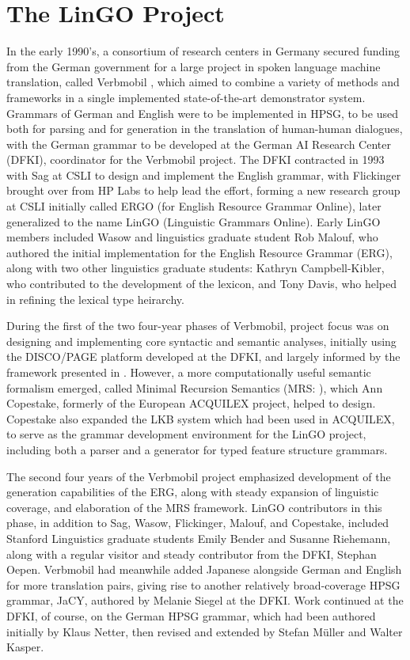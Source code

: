 \documentclass[output=paper]{langsci/langscibook}
\begin{document}
\section{The LinGO Project}

In the early 1990's, a consortium of research centers in Germany secured funding from the German government for a large project in spoken language machine translation, called Verbmobil \citep{Wahlster2000a-ed}, which aimed to combine a variety of methods and frameworks in a single implemented state-of-the-art demonstrator system.  Grammars of German and English were to be implemented in HPSG, to be used both for parsing and for generation in the translation of human-human dialogues, with the German grammar to be developed at the German AI Research Center (DFKI), coordinator for the Verbmobil project.  The DFKI contracted in 1993 with Sag at CSLI to design and implement the English grammar, with Flickinger brought over from HP Labs to help lead the effort, forming a new research group at CSLI initially called ERGO (for English Resource Grammar Online), later generalized to the name LinGO (Linguistic Grammars Online).  Early LinGO members included Wasow and linguistics graduate student Rob Malouf, who authored the initial implementation for the English Resource Grammar (ERG), along with two other linguistics graduate students: Kathryn Campbell-Kibler, who contributed to the development of the lexicon, and Tony Davis, who helped in refining the lexical type heirarchy.

During the first of the two four-year phases of Verbmobil, project focus was on designing and implementing core syntactic and semantic analyses, initially using the DISCO/PAGE platform developed at the DFKI, and largely informed by the framework presented in \citet{ps2}.  However, a more computationally useful semantic formalism emerged, called Minimal Recursion Semantics (MRS: \citet{mrs}), which Ann Copestake, formerly of the European ACQUILEX project, helped to design.  Copestake also expanded the LKB system \citep{Copestake2002a-Short} which had been used in ACQUILEX, to serve as the grammar development environment for the LinGO project, including both a parser and a generator for typed feature structure grammars.

The second four years of the Verbmobil project emphasized development of the generation capabilities of the ERG, along with steady expansion of linguistic coverage, and elaboration of the MRS framework.  LinGO contributors in this phase, in addition to Sag, Wasow, Flickinger, Malouf, and Copestake, included Stanford Linguistics graduate students Emily Bender and Susanne Riehemann, along with a regular visitor and steady contributor from the DFKI, Stephan Oepen.  Verbmobil had meanwhile added Japanese alongside German and English for more translation pairs, giving rise to another relatively broad-coverage HPSG grammar, JaCY, authored by Melanie Siegel at the DFKI.  Work continued at the DFKI, of course, on the German HPSG grammar, which had been authored initially by Klaus Netter, then revised and extended by Stefan M{\"u}ller and Walter Kasper.
\end{document}

